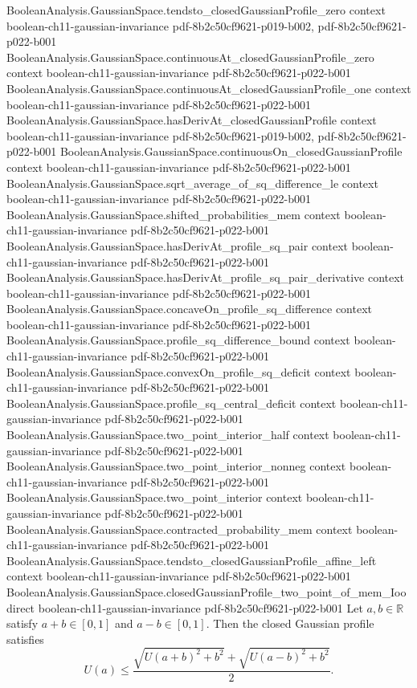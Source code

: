 \begin{theorem}
\proofstep
  {BooleanAnalysis.GaussianSpace.tendsto_closedGaussianProfile_zero}
  {context}
  {boolean-ch11-gaussian-invariance}
  {pdf-8b2c50cf9621-p019-b002,
    pdf-8b2c50cf9621-p022-b001}
\proofstep
  {BooleanAnalysis.GaussianSpace.continuousAt_closedGaussianProfile_zero}
  {context}
  {boolean-ch11-gaussian-invariance}
  {pdf-8b2c50cf9621-p022-b001}
\proofstep
  {BooleanAnalysis.GaussianSpace.continuousAt_closedGaussianProfile_one}
  {context}
  {boolean-ch11-gaussian-invariance}
  {pdf-8b2c50cf9621-p022-b001}
\proofstep
  {BooleanAnalysis.GaussianSpace.hasDerivAt_closedGaussianProfile}
  {context}
  {boolean-ch11-gaussian-invariance}
  {pdf-8b2c50cf9621-p019-b002,
    pdf-8b2c50cf9621-p022-b001}
\proofstep
  {BooleanAnalysis.GaussianSpace.continuousOn_closedGaussianProfile}
  {context}
  {boolean-ch11-gaussian-invariance}
  {pdf-8b2c50cf9621-p022-b001}
\proofstep
  {BooleanAnalysis.GaussianSpace.sqrt_average_of_sq_difference_le}
  {context}
  {boolean-ch11-gaussian-invariance}
  {pdf-8b2c50cf9621-p022-b001}
\proofstep
  {BooleanAnalysis.GaussianSpace.shifted_probabilities_mem}
  {context}
  {boolean-ch11-gaussian-invariance}
  {pdf-8b2c50cf9621-p022-b001}
\proofstep
  {BooleanAnalysis.GaussianSpace.hasDerivAt_profile_sq_pair}
  {context}
  {boolean-ch11-gaussian-invariance}
  {pdf-8b2c50cf9621-p022-b001}
\proofstep
  {BooleanAnalysis.GaussianSpace.hasDerivAt_profile_sq_pair_derivative}
  {context}
  {boolean-ch11-gaussian-invariance}
  {pdf-8b2c50cf9621-p022-b001}
\proofstep
  {BooleanAnalysis.GaussianSpace.concaveOn_profile_sq_difference}
  {context}
  {boolean-ch11-gaussian-invariance}
  {pdf-8b2c50cf9621-p022-b001}
\proofstep
  {BooleanAnalysis.GaussianSpace.profile_sq_difference_bound}
  {context}
  {boolean-ch11-gaussian-invariance}
  {pdf-8b2c50cf9621-p022-b001}
\proofstep
  {BooleanAnalysis.GaussianSpace.convexOn_profile_sq_deficit}
  {context}
  {boolean-ch11-gaussian-invariance}
  {pdf-8b2c50cf9621-p022-b001}
\proofstep
  {BooleanAnalysis.GaussianSpace.profile_sq_central_deficit}
  {context}
  {boolean-ch11-gaussian-invariance}
  {pdf-8b2c50cf9621-p022-b001}
\proofstep
  {BooleanAnalysis.GaussianSpace.two_point_interior_half}
  {context}
  {boolean-ch11-gaussian-invariance}
  {pdf-8b2c50cf9621-p022-b001}
\proofstep
  {BooleanAnalysis.GaussianSpace.two_point_interior_nonneg}
  {context}
  {boolean-ch11-gaussian-invariance}
  {pdf-8b2c50cf9621-p022-b001}
\proofstep
  {BooleanAnalysis.GaussianSpace.two_point_interior}
  {context}
  {boolean-ch11-gaussian-invariance}
  {pdf-8b2c50cf9621-p022-b001}
\proofstep
  {BooleanAnalysis.GaussianSpace.contracted_probability_mem}
  {context}
  {boolean-ch11-gaussian-invariance}
  {pdf-8b2c50cf9621-p022-b001}
\proofstep
  {BooleanAnalysis.GaussianSpace.tendsto_closedGaussianProfile_affine_left}
  {context}
  {boolean-ch11-gaussian-invariance}
  {pdf-8b2c50cf9621-p022-b001}
\proofstep
  {BooleanAnalysis.GaussianSpace.closedGaussianProfile_two_point_of_mem_Ioo}
  {direct}
  {boolean-ch11-gaussian-invariance}
  {pdf-8b2c50cf9621-p022-b001}
Let $a,b\in\mathbb R$ satisfy $a+b\in[0,1]$ and $a-b\in[0,1]$. Then the closed Gaussian
profile satisfies
\[
U(a)\le \frac{\sqrt{U(a+b)^2+b^2}+\sqrt{U(a-b)^2+b^2}}{2}.
\]
\end{theorem}

